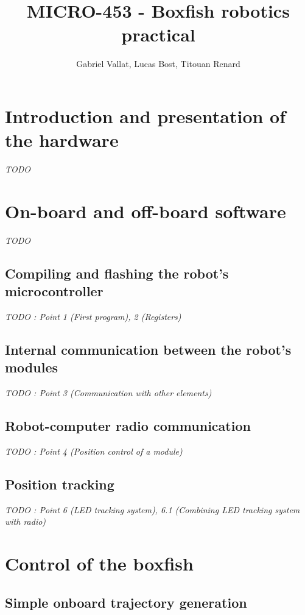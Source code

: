 \documentclass[11pt]{article}
\title{MICRO-453 - Boxfish robotics practical}
\author{Gabriel Vallat, Lucas Bost, Titouan Renard}
\begin{document}
\maketitle
\tableofcontents
\section{Introduction and presentation of the hardware}

\textit{TODO}

\section{On-board and off-board software}

\textit{TODO}
\subsection{Compiling and flashing the robot's microcontroller}

\textit{TODO : Point 1 (First program), 2 (Registers)}

\subsection{Internal communication between the robot's modules}

\textit{TODO : Point 3 (Communication with other elements)}

\subsection{Robot-computer radio communication}

\textit{TODO : Point 4 (Position control of a module)}

\subsection{Position tracking}

\textit{TODO : Point 6 (LED tracking system), 6.1 (Combining LED tracking system with radio)}

\section{Control of the boxfish}

\subsection{Simple onboard trajectory generation}
\end{document}
